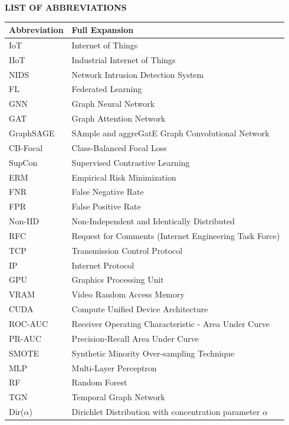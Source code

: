 \documentclass[12pt,a4paper]{report}
\begin{document}
\thispagestyle{plain}
\listoffigures
\clearpage

\thispagestyle{plain}
\begin{center}
    {\fontsize{14}{17}\selectfont \textbf{LIST OF ABBREVIATIONS}}\\[16pt]
\end{center}

\begin{table}[H]
\centering
\begin{tabularx}{\textwidth}{l X}
\toprule
\textbf{Abbreviation} & \textbf{Full Expansion} \\
\midrule
IoT & Internet of Things \\
IIoT & Industrial Internet of Things \\
NIDS & Network Intrusion Detection System \\
FL & Federated Learning \\
GNN & Graph Neural Network \\
GAT & Graph Attention Network \\
GraphSAGE & SAmple and aggreGatE Graph Convolutional Network \\
CB-Focal & Class-Balanced Focal Loss \\
SupCon & Supervised Contrastive Learning \\
ERM & Empirical Risk Minimization \\
FNR & False Negative Rate \\
FPR & False Positive Rate \\
Non-IID & Non-Independent and Identically Distributed \\
RFC & Request for Comments (Internet Engineering Task Force) \\
TCP & Transmission Control Protocol \\
IP & Internet Protocol \\
GPU & Graphics Processing Unit \\
VRAM & Video Random Access Memory \\
CUDA & Compute Unified Device Architecture \\
ROC-AUC & Receiver Operating Characteristic - Area Under Curve \\
PR-AUC & Precision-Recall Area Under Curve \\
SMOTE & Synthetic Minority Over-sampling Technique \\
MLP & Multi-Layer Perceptron \\
RF & Random Forest \\
TGN & Temporal Graph Network \\
Dir($\alpha$) & Dirichlet Distribution with concentration parameter $\alpha$ \\
\bottomrule
\end{tabularx}
\end{table}
\clearpage
\end{document}
